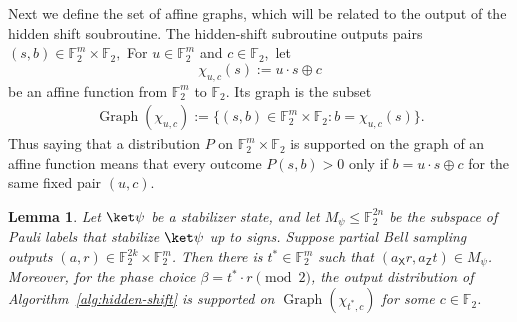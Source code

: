 \documentclass[11pt]{article}
\newtheorem{lemma}[theorem]{Lemma}
\newcommand{\Z}{\mathsf{Z}}
\newcommand{\X}{\mathsf{X}}
\newcommand{\F}{\mathbb{F}}
\begin{document}
Next we define the set of affine graphs, which will be related to the output of the hidden shift soubroutine. 
The hidden-shift subroutine outputs pairs
$  (s,b)\in \mathbb F_2^m\times\mathbb F_2,
$ 
For $u\in\mathbb F_2^m$ and $c\in\mathbb F_2$,~let
$$
    \chi_{u,c}(s):=u\cdot s\oplus c
$$
be an affine function from $\mathbb F_2^m$ to $\mathbb F_2$.  Its graph is
the subset
\begin{align}
    \label{eq:graphchi}
    \operatorname{Graph}(\chi_{u,c})
    :=
    \{(s,b)\in\mathbb F_2^m\times\mathbb F_2:
      b=\chi_{u,c}(s)\}.
\end{align}
Thus saying that a distribution $P$ on
$\mathbb F_2^m\times\mathbb F_2$ is supported on the graph of an affine
function means that every outcome $P(s,b) > 0$ only if $b = u\cdot s \oplus c$ for the same fixed pair $(u,c)$.

\begin{lemma}
\label{lem:hidden-shift-completeness}
Let $\ket\psi$ be a stabilizer state, and let $M_\psi\le\F_2^{2n}$ be the
subspace of Pauli labels that stabilize $\ket\psi$ up to signs.  Suppose
partial Bell sampling outputs $(a,r)\in\F_2^{2k}\times\F_2^m$.  Then there is
$t^*\in\F_2^m$ such that $(a_\X r, a_\Z t)\in M_\psi$. Moreover, for the phase choice $\beta=t^*\cdot r \pmod 2$, the output
distribution of Algorithm~\ref{alg:hidden-shift} is supported  on
$\operatorname{Graph}(\chi_{t^\ast,c})$
for some $c\in\mathbb F_2$.
\end{lemma}
\end{document}
